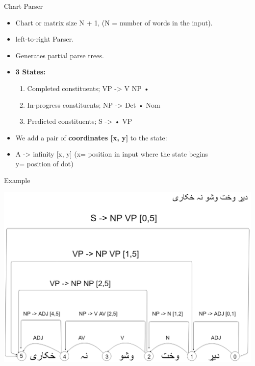 \documentclass{beamer}
\begin{document}
\begin{frame}{Chart Parser}
\begin{itemize}
	\item Chart or matrix size N + 1, (N = number of words in the input). \\
	\vspace{0.5em}
	\item left-to-right Parser.
	\vspace{0.5em}
	\item Generates partial parse trees.
	\vspace{0.5em}
	\item \textbf{3 States:}
	\begin{enumerate}
	\item Completed constituents; VP -> V NP •
	\item In-progress constituents; NP -> Det • Nom
	\item Predicted constituents; S -> • VP
	\end{enumerate}
	\vspace{1em}
	\item We add a pair of \textbf{coordinates [x, y]} to the state: \\
	\vspace{0.5em}
	\item A -> infinity [x, y]  (x= position in input where the state begins \\
				\hspace{0.5em}	y= position of dot)
	                             
\end{itemize}
\end{frame}



\begin{frame}{Example}
\begin{center}
	\includegraphics[scale=0.18]{45.png}	
\end{center}
\end{frame}
\end{document}
